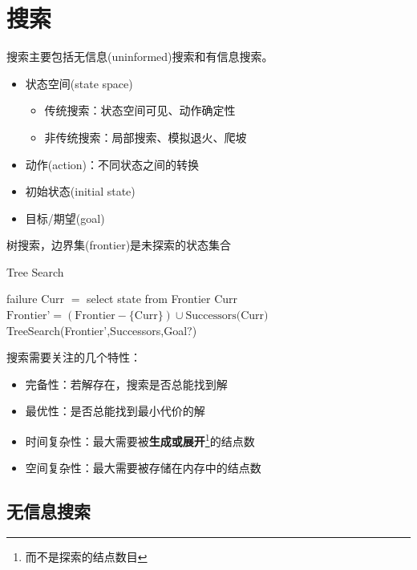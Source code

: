 
\section{搜索}
搜索主要包括无信息(uninformed)搜索和有信息搜索。
\begin{itemize}
	\item 状态空间(state space)
	\begin{itemize}
		\item 传统搜索：状态空间可见、动作确定性
		\item 非传统搜索：局部搜索、模拟退火、爬坡
	\end{itemize}
	\item 动作(action)：不同状态之间的转换
	\item 初始状态(initial state)
	\item 目标/期望(goal)
\end{itemize}

树搜索，边界集(frontier)是未探索的状态集合
\begin{algorithm}[H]
\caption{Tree Search}
\begin{algorithmic}[1]
\State \Return failure
\EndIf
\State Curr $=$ select state from Frontier
\State \Return Curr
\EndIf
\State $\text{Frontier'} = (\text{Frontier} - \{\text{Curr}\}) \cup \text{Successors(Curr)}$
\State \Return TreeSearch(Frontier',Successors,Goal?)
\EndProcedure
\end{algorithmic}
\end{algorithm}

搜索需要关注的几个特性：
\begin{itemize}
	\item 完备性：若解存在，搜索是否总能找到解
	\item 最优性：是否总能找到最小代价的解
	\item 时间复杂性：最大需要被\textbf{生成或展开}\footnote{而不是探索的结点数目}的结点数
	\item 空间复杂性：最大需要被存储在内存中的结点数
\end{itemize}

\subsection{无信息搜索}
